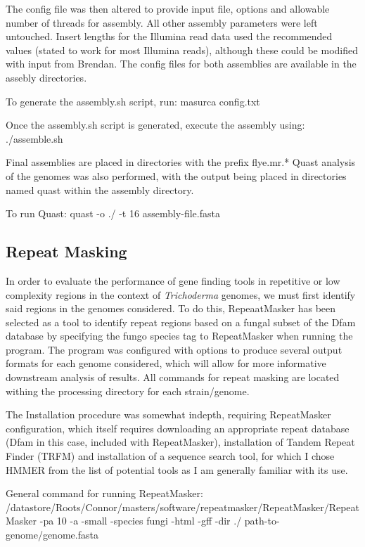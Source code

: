 \documentclass[12pt]{article}
\begin{document}
The config file was then altered to provide input file, options and
allowable number of threads for assembly. All other assembly
parameters were left untouched. Insert lengths for the Illumina read
data used the recommended values (stated to work for most Illumina
reads), although these could be modified with input from Brendan. The
config files for both assemblies are available in the assebly
directories.

To generate the assembly.sh script, run:
masurca config.txt

Once the assembly.sh script is generated, execute the assembly using:
./assemble.sh

Final assemblies are placed in directories with the prefix flye.mr.*
Quast analysis of the genomes was also performed, with the output
being placed in directories named quast within the assembly directory.

To run Quast:
quast -o ./ -t 16 assembly-file.fasta

\subsection{Repeat Masking}

In order to evaluate the performance of gene finding tools in
repetitive or low complexity regions in the context of
\textit{Trichoderma} genomes, we must first identify said regions in
the genomes considered. To do this, RepeaatMasker has been selected as
a tool to identify repeat regions based on a fungal subset of the Dfam
database by specifying the fungo species tag to RepeatMasker when
running the program. The program was configured with options to
produce several output formats for each genome considered, which will
allow for more informative downstream analysis of results. All
commands for repeat masking are located withing the processing
directory for each strain/genome.

The Installation procedure was somewhat indepth, requiring
RepeatMasker configuration, which itself requires downloading an
appropriate repeat database (Dfam in this case, included with
RepeatMasker), installation of Tandem Repeat Finder (TRFM) and
installation of a sequence search tool, for which I chose HMMER from
the list of potential tools as I am generally familiar with its use.

General command for running RepeatMasker:
/datastore/Roots/Connor/masters/software/repeatmasker/RepeatMasker/RepeatMasker
-pa 10 -a -small -species fungi -html -gff -dir ./
path-to-genome/genome.fasta
\end{document}
